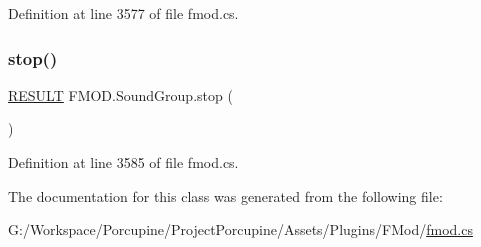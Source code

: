 Definition at line 3577 of file fmod.\+cs.

\mbox{\label{class_f_m_o_d_1_1_sound_group_a925cd965a5b796515c94e60bb4951ba8}} 
\subsubsection{\texorpdfstring{stop()}{stop()}}
{\footnotesize\ttfamily \hyperlink{namespace_f_m_o_d_a305d1176ef3f8c8815861a60407ac33d}{R\+E\+S\+U\+LT} F\+M\+O\+D.\+Sound\+Group.\+stop (\begin{DoxyParamCaption}{ }\end{DoxyParamCaption})}



Definition at line 3585 of file fmod.\+cs.



The documentation for this class was generated from the following file\+:\begin{DoxyCompactItemize}
\item 
G\+:/\+Workspace/\+Porcupine/\+Project\+Porcupine/\+Assets/\+Plugins/\+F\+Mod/\hyperlink{fmod_8cs}{fmod.\+cs}\end{DoxyCompactItemize}
